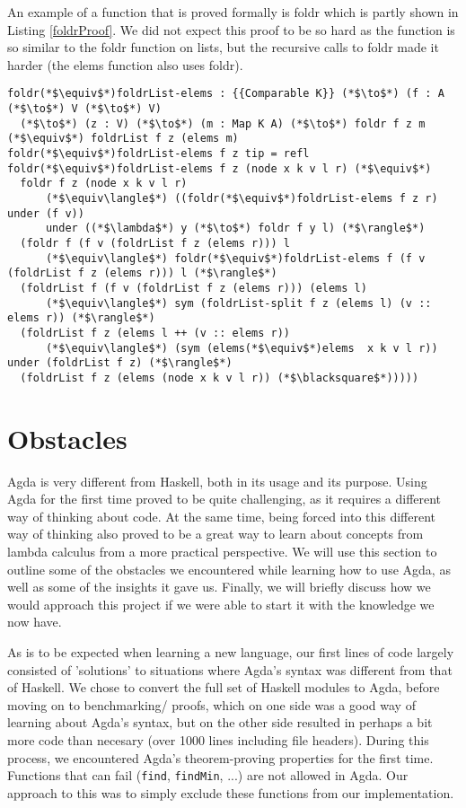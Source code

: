 \documentclass[a4paper,UKenglish,cleveref, autoref, thm-restate]{template/lipics-v2021}
\begin{document}
An example of a function that is proved formally is foldr which is partly shown in Listing \ref{foldrProof}. We did not expect this proof to be so hard as the function is so similar to the foldr function on lists, but the recursive calls to foldr made it harder (the elems function also uses foldr).

\begin{lstlisting}[label=foldrProof,caption=The following equality is proved foldr f z $\equiv$ foldr f z . elems]    
foldr(*$\equiv$*)foldrList-elems : {{Comparable K}} (*$\to$*) (f : A (*$\to$*) V (*$\to$*) V) 
  (*$\to$*) (z : V) (*$\to$*) (m : Map K A) (*$\to$*) foldr f z m (*$\equiv$*) foldrList f z (elems m)
foldr(*$\equiv$*)foldrList-elems f z tip = refl
foldr(*$\equiv$*)foldrList-elems f z (node x k v l r) (*$\equiv$*) 
  foldr f z (node x k v l r) 
      (*$\equiv\langle$*) ((foldr(*$\equiv$*)foldrList-elems f z r) under (f v)) 
      under ((*$\lambda$*) y (*$\to$*) foldr f y l) (*$\rangle$*)
  (foldr f (f v (foldrList f z (elems r))) l 
      (*$\equiv\langle$*) foldr(*$\equiv$*)foldrList-elems f (f v (foldrList f z (elems r))) l (*$\rangle$*)
  (foldrList f (f v (foldrList f z (elems r))) (elems l) 
      (*$\equiv\langle$*) sym (foldrList-split f z (elems l) (v :: elems r)) (*$\rangle$*)
  (foldrList f z (elems l ++ (v :: elems r)) 
      (*$\equiv\langle$*) (sym (elems(*$\equiv$*)elems  x k v l r)) under (foldrList f z) (*$\rangle$*)
  (foldrList f z (elems (node x k v l r)) (*$\blacksquare$*))))) 
\end{lstlisting}

\section{Obstacles}
Agda is very different from Haskell, both in its usage and its purpose. Using Agda for the first time proved to be quite challenging, as it requires a different way of thinking about code. At the same time, being forced into this different way of thinking also proved to be a great way to learn about concepts from lambda calculus from a more practical perspective. We will use this section to outline some of the obstacles we encountered while learning how to use Agda, as well as some of the insights it gave us. Finally, we will briefly discuss how we would approach this project if we were able to start it with the knowledge we now have.

As is to be expected when learning a new language, our first lines of code largely consisted of 'solutions' to situations where Agda's syntax was different from that of Haskell. We chose to convert the full set of Haskell modules to Agda, before moving on to benchmarking/ proofs, which on one side was a good way of learning about Agda's syntax, but on the other side resulted in perhaps a bit more code than necesary (over 1000 lines including file headers). During this process, we encountered Agda's theorem-proving properties for the first time. Functions that can fail (\texttt{find}, \texttt{findMin}, ...) are not allowed in Agda. Our approach to this was to simply exclude these functions from our implementation.
\end{document}
